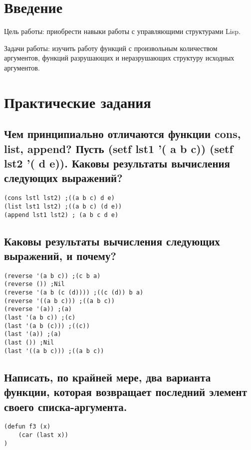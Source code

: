 \documentclass[a4paper, 14pt, unknownkeysallowed]{extreport}
\begin{document}

\setcounter{page}{2}

\chapter*{Введение}
Цель работы: приобрести навыки работы с управляющими структурами Lisp.

Задачи работы: изучить работу функций с произвольным количеством аргументов, функций
разрушающих и неразрушающих структуру исходных аргументов.

\chapter{Практические задания}

\section{Чем принципиально отличаются функции cons, list, append?
	Пусть (setf lst1 '( a b c)) 
	(setf lst2 '( d e)). 
	Каковы результаты вычисления следующих выражений?}
\begin{lstlisting}
(cons lstl lst2) ;((a b c) d e)
(list lst1 lst2) ;((a b c) (d e))
(append lst1 lst2) ; (a b c d e)
\end{lstlisting}

\section{Каковы результаты вычисления следующих выражений, и почему?}

\begin{lstlisting}
(reverse '(a b c)) ;(c b a)
(reverse ()) ;Nil
(reverse '(a b (c (d)))) ;((c (d)) b a)
(reverse '((a b c))) ;((a b c))
(reverse '(a)) ;(a)
(last '(a b c)) ;(c)
(last '(a b (c))) ;((c))
(last '(a)) ;(a)
(last ()) ;Nil
(last '((a b c))) ;((a b c))
\end{lstlisting}

\section{Написать, по крайней мере, два варианта функции, которая возвращает
	последний элемент своего списка-аргумента.}

\begin{lstlisting}
(defun f3 (x)
	(car (last x))
)
\end{lstlisting}
\end{document}
